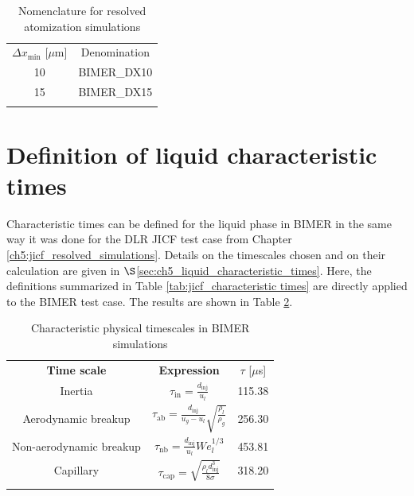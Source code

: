 \begin{table}[!h]
\centering
\caption{Nomenclature for resolved atomization simulations}
\begin{tabular}{cc}
\thickhline
$\Delta x_\mathrm{min}$ [$\mu$m]  &  Denomination \\ 
\thickhline
10 & BIMER\_DX10 \\
15 & BIMER\_DX15 \\
\thickhline
\end{tabular}
\label{tab:BIMER_resolved_simulations_performed}
\end{table}




\section{Definition of liquid characteristic times}

Characteristic times can be defined for the liquid phase in BIMER in the same way it was done for the DLR JICF test case from Chapter \ref{ch5:jicf_resolved_simulations}. Details on the timescales chosen and on their calculation are given in $\S$\ref{sec:ch5_liquid_characteristic_times}. Here, the definitions summarized in Table \ref{tab:jicf_characteristic times} are directly applied to the BIMER test case. The results are shown in Table \ref{tab:BIMER_SPS_characteristic times}. 

\begin{table}[!h]
\centering
\caption{Characteristic physical timescales in BIMER simulations}
\begin{tabular}{ccc}
\thickhline
\textbf{Time scale} & \textbf{Expression} & $\tau$ [$\mu$s] \\
\thickhline
Inertia & $\tau_\mathrm{in} = \frac{d_\mathrm{inj}}{u_l}$ & 115.38 \\
Aerodynamic breakup  &  $\tau_\mathrm{ab} =  \frac{d_\mathrm{inj}}{u_g - u_l} \sqrt{\frac{\rho_l}{\rho_g}} $ & 256.30 \\
Non-aerodynamic breakup  &  $\tau_\mathrm{nb} = \frac{d_\mathrm{inj}}{u_l} We_l^{1/3} $ &  453.81 \\
Capillary & $\tau_\mathrm{cap} = \sqrt{\frac{\rho_l d_\mathrm{inj}^3}{8 \sigma}}$ & 318.20 \\
\thickhline
\end{tabular}
\label{tab:BIMER_SPS_characteristic times}
\end{table} 


